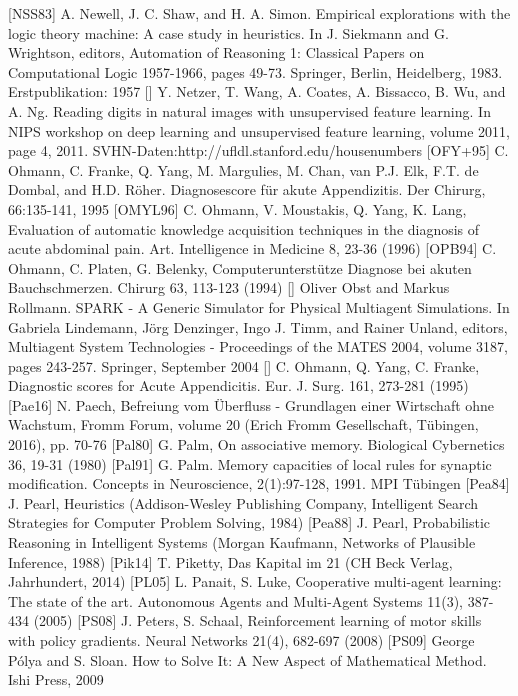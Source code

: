 \documentclass[10pt]{book}
\begin{document}
[NSS83] A. Newell, J. C. Shaw, and H. A. Simon. Empirical explorations with the logic theory machine: A case study in heuristics. In J. Siekmann and G. Wrightson, editors, Automation of Reasoning 1: Classical Papers on Computational Logic 1957-1966, pages 49-73. Springer, Berlin, Heidelberg, 1983. Erstpublikation: 1957
[\cite{netzer2011svhn}] Y. Netzer, T. Wang, A. Coates, A. Bissacco, B. Wu, and A. Ng. Reading digits in natural images with unsupervised feature learning. In NIPS workshop on deep learning and unsupervised feature learning, volume 2011, page 4, 2011. SVHN-Daten:http://ufldl.stanford.edu/housenumbers
[OFY+95] C. Ohmann, C. Franke, Q. Yang, M. Margulies, M. Chan, van P.J. Elk, F.T. de Dombal, and H.D. Röher. Diagnosescore für akute Appendizitis. Der Chirurg, 66:135-141, 1995
[OMYL96] C. Ohmann, V. Moustakis, Q. Yang, K. Lang, Evaluation of automatic knowledge acquisition techniques in the diagnosis of acute abdominal pain. Art. Intelligence in Medicine 8, 23-36 (1996)
[OPB94] C. Ohmann, C. Platen, G. Belenky, Computerunterstütze Diagnose bei akuten Bauchschmerzen. Chirurg 63, 113-123 (1994)
[\cite{obst2004spark}] Oliver Obst and Markus Rollmann. SPARK - A Generic Simulator for Physical Multiagent Simulations. In Gabriela Lindemann, Jörg Denzinger, Ingo J. Timm, and Rainer Unland, editors, Multiagent System Technologies - Proceedings of the MATES 2004, volume 3187, pages 243-257. Springer, September 2004
[\cite{ohmann1995diagnostic}] C. Ohmann, Q. Yang, C. Franke, Diagnostic scores for Acute Appendicitis. Eur. J. Surg. 161, 273-281 (1995)
[Pae16] N. Paech, Befreiung vom Überfluss - Grundlagen einer Wirtschaft ohne Wachstum, Fromm Forum, volume 20 (Erich Fromm Gesellschaft, Tübingen, 2016), pp. 70-76
[Pal80] G. Palm, On associative memory. Biological Cybernetics 36, 19-31 (1980)
[Pal91] G. Palm. Memory capacities of local rules for synaptic modification. Concepts in Neuroscience, 2(1):97-128, 1991. MPI Tübingen
[Pea84] J. Pearl, Heuristics (Addison-Wesley Publishing Company, Intelligent Search Strategies for Computer Problem Solving, 1984)
[Pea88] J. Pearl, Probabilistic Reasoning in Intelligent Systems (Morgan Kaufmann, Networks of Plausible Inference, 1988)
[Pik14] T. Piketty, Das Kapital im 21 (CH Beck Verlag, Jahrhundert, 2014)
[PL05] L. Panait, S. Luke, Cooperative multi-agent learning: The state of the art. Autonomous Agents and Multi-Agent Systems 11(3), 387-434 (2005)
[PS08] J. Peters, S. Schaal, Reinforcement learning of motor skills with policy gradients. Neural Networks 21(4), 682-697 (2008)
[PS09] George Pólya and S. Sloan. How to Solve It: A New Aspect of Mathematical Method. Ishi Press, 2009
\end{document}
